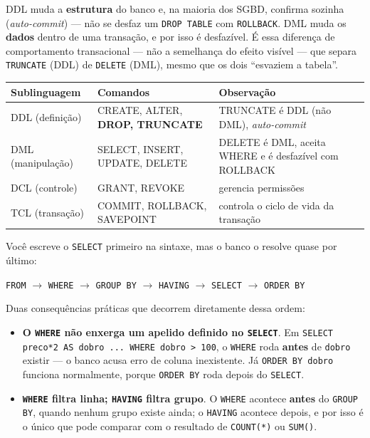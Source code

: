 \begin{conceito}
DDL muda a \textbf{estrutura} do banco e, na maioria dos SGBD, confirma
sozinha (\textit{auto-commit}) --- não se desfaz um \texttt{DROP TABLE}
com \texttt{ROLLBACK}. DML muda os \textbf{dados} dentro de uma
transação, e por isso é desfazível. É essa diferença de comportamento
transacional --- não a semelhança do efeito visível --- que separa
\texttt{TRUNCATE} (DDL) de \texttt{DELETE} (DML), mesmo que os dois
“esvaziem a tabela”.

\begin{center}
\begin{tabular}{@{}p{2.6cm}p{4cm}p{4.5cm}@{}}
\toprule
\textbf{Sublinguagem} & \textbf{Comandos} & \textbf{Observação} \\
\midrule
DDL (definição) & CREATE, ALTER, \textbf{DROP, TRUNCATE} & TRUNCATE é DDL
(não DML), \textit{auto-commit} \\
DML (manipulação) & SELECT, INSERT, UPDATE, DELETE & DELETE é DML, aceita
WHERE e é desfazível com ROLLBACK \\
DCL (controle) & GRANT, REVOKE & gerencia permissões \\
TCL (transação) & COMMIT, ROLLBACK, SAVEPOINT & controla o ciclo de vida
da transação \\
\bottomrule
\end{tabular}
\end{center}
\end{conceito}

\begin{conceito}
Você escreve o \texttt{SELECT} primeiro na sintaxe, mas o banco o resolve
quase por último:

\begin{center}
\texttt{FROM} $\to$ \texttt{WHERE} $\to$ \texttt{GROUP BY} $\to$
\texttt{HAVING} $\to$ \texttt{SELECT} $\to$ \texttt{ORDER BY}
\end{center}

Duas consequências práticas que decorrem diretamente dessa ordem:

\begin{itemize}
\item \textbf{O \texttt{WHERE} não enxerga um apelido definido no
\texttt{SELECT}}. Em \texttt{SELECT preco*2 AS dobro ... WHERE dobro >
100}, o \texttt{WHERE} roda \textbf{antes} de \texttt{dobro} existir --- o
banco acusa erro de coluna inexistente. Já \texttt{ORDER BY dobro}
funciona normalmente, porque \texttt{ORDER BY} roda depois do
\texttt{SELECT}.
\item \textbf{\texttt{WHERE} filtra linha; \texttt{HAVING} filtra
grupo}. O \texttt{WHERE} acontece \textbf{antes} do \texttt{GROUP BY},
quando nenhum grupo existe ainda; o \texttt{HAVING} acontece depois, e por
isso é o único que pode comparar com o resultado de \texttt{COUNT(*)} ou
\texttt{SUM()}.
\end{itemize}
\end{conceito}


